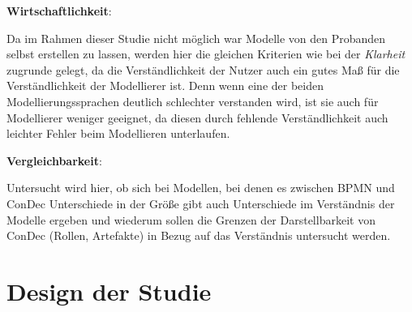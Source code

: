 \textbf{Wirtschaftlichkeit}: 

Da im Rahmen dieser Studie nicht möglich war Modelle von den Probanden selbst erstellen zu lassen, werden hier die gleichen Kriterien wie bei der \textit{Klarheit} zugrunde gelegt, da die Verständlichkeit der Nutzer auch ein gutes Maß für die Verständlichkeit der Modellierer ist. Denn wenn eine der beiden Modellierungssprachen deutlich schlechter verstanden wird, ist sie auch für Modellierer weniger geeignet, da diesen durch fehlende Verständlichkeit auch leichter Fehler beim Modellieren unterlaufen.\newline

\textbf{Vergleichbarkeit}: 

Untersucht wird hier, ob sich bei Modellen, bei denen es zwischen BPMN und ConDec Unterschiede in der Größe gibt auch Unterschiede im Verständnis der Modelle ergeben und wiederum sollen die Grenzen der Darstellbarkeit von ConDec (Rollen, Artefakte) in Bezug auf das Verständnis untersucht werden.\newline

\section{Design der Studie}


